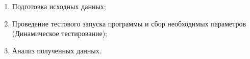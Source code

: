 \begin{enumerate}
\item Подготовка исходных данных;
\item Проведение тестового запуска программы и сбор необходимых параметров (Динамическое тестирование);
\item Анализ полученных данных.
\end{enumerate}
